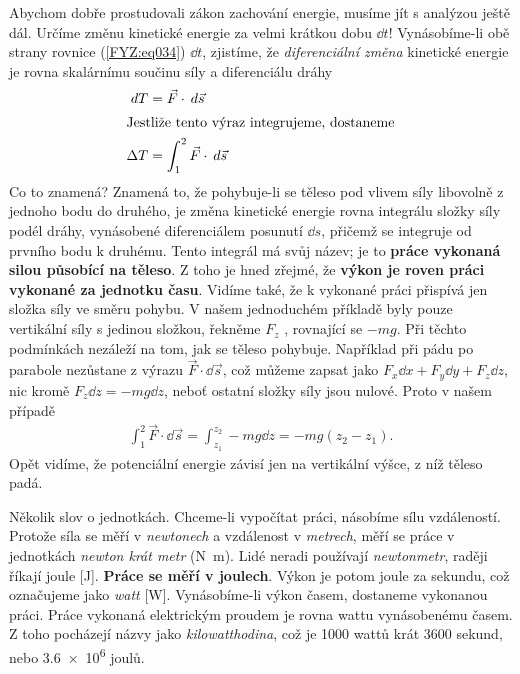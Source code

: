     Abychom dobře prostudovali zákon zachování energie, musíme jít s analýzou ještě dál. Určíme 
    změnu kinetické energie za velmi krátkou dobu \(\dd{t}\)! Vynásobíme-li obě strany rovnice 
    (\ref{FYZ:eq034}) \(\dd{t}\), zjistíme, že \emph{diferenciální změna} kinetické energie je 
    rovna skalárnímu součinu síly a diferenciálu dráhy
    \begin{align}
      \hspace{2pt}dT    &= \vec{F}\cdot\hspace{2pt}d\vec{s}              \label{FYZ:eq035} \\
      \shortintertext{Jestliže tento výraz integrujeme, dostaneme}
      \Delta T  &= \int_{1}^{2}\vec{F}\cdot\hspace{2pt}d\vec{s}  \label{FYZ:eq036}
    \end{align}
    Co to znamená? Znamená to, že pohybuje-li se těleso pod vlivem síly libovolně z jednoho bodu do 
    druhého, je změna kinetické energie rovna integrálu složky síly podél dráhy, vynásobené 
    diferenciálem posunutí \(\dd{s}\), přičemž se integruje od prvního bodu k druhému. Tento 
    integrál má svůj název; je to \textbf{práce vykonaná silou působící na těleso}. Z toho je hned 
    zřejmé, že \textbf{výkon je roven práci vykonané za jednotku času}. Vidíme také, že k vykonané 
    práci přispívá jen složka síly ve směru pohybu. V našem jednoduchém příkladě byly pouze 
    vertikální síly s jedinou složkou, řekněme \(F_z\) , rovnající se \(- mg\). Při těchto 
    podmínkách nezáleží na tom, jak se těleso pohybuje. Například při pádu po parabole nezůstane z 
    výrazu \(\vec{F}\cdot\dd{\vec{s}}\), což můžeme zapsat jako \(F_x\dd{x} + F_y\dd{y} + 
    F_z\dd{z}\), nic kromě \(F_z\dd{z}=-mg\dd{z}\), neboť ostatní složky síly jsou nulové. Proto v 
    našem případě
    \begin{align}
      \int_{1}^{2}\vec{F}\cdot\dd{\vec{s}} = 
      \int_{z_1}^{z_2}-mg\dd{z} = 
      -mg(z_2 - z_1). \label{FYZ:eq037}
    \end{align}
    Opět vidíme, že potenciální energie závisí jen na vertikální výšce, z níž těleso padá.
    
    Několik slov o jednotkách. Chceme-li vypočítat práci, násobíme sílu vzdáleností. Protože síla 
    se měří v \emph{newtonech} a vzdálenost v \emph{metrech}, měří se práce v jednotkách 
    \emph{newton krát metr} (\si{\newton\meter}). Lidé neradi používají \emph{newtonmetr}, raději 
    říkají joule [\si{\joule}]. \textbf{Práce se měří v joulech}. Výkon je potom joule za sekundu, 
    což označujeme jako \emph{watt} [\si{\watt}]. Vynásobíme-li výkon časem, dostaneme vykonanou 
    práci. Práce vykonaná elektrickým proudem je rovna wattu vynásobenému časem. Z toho pocházejí 
    názvy jako \emph{kilowatthodina}, což je \num{1000} wattů krát \num{3600} sekund, nebo 
    \num{3.6e6} joulů.
    
